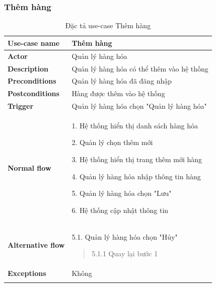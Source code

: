 \subsubsection{Thêm hàng}
{
    \setlength\extrarowheight{6pt}
    \begin{longtable}{| p{} | p{} |}
        \hline
        \textbf{Use-case name}
         &
        Thêm hàng
        \\
        \hline
        \textbf{Actor}
         &
        Quản lý hàng hóa
        \\
        \hline
        \textbf{Description}
         &
        Quản lý hàng hóa có thể thêm vào hệ thống
        \\
        \hline
        \textbf{Preconditions}
         &
        Quản lý hàng hóa đã đăng nhập
        \\
        \hline
        \textbf{Postconditions}
         &
        Hàng được thêm vào hệ thống
        \\
        \hline
        \textbf{Trigger}
         &
        Quản lý hàng hóa chọn "Quản lý hàng hóa"
        \\
        \hline
        \begin{flushleft}
            \textbf{Normal flow}
        \end{flushleft}
         &
        1. Hệ thống hiển thị danh sách hàng hóa

        2. Quản lý chọn thêm mới

        3. Hệ thống hiển thị trang thêm mới hàng

        4. Quản lý hàng hóa nhập thông tin hàng

        5. Quản lý hàng hóa chọn "Lưu"

        6. Hệ thống cập nhật thông tin
        \\
        \hline
        \begin{flushleft}
            \textbf{Alternative flow}
        \end{flushleft}
         &
        5.1. Quản lý hàng hóa chọn "Hủy"
        \begin{quote}

            5.1.1 Quay lại bước 1
        \end{quote}
        \\
        \hline
        \textbf{Exceptions}
         &
        Không
        \\
        \hline
        \caption{Đặc tả use-case Thêm hàng}
    \end{longtable}
}

